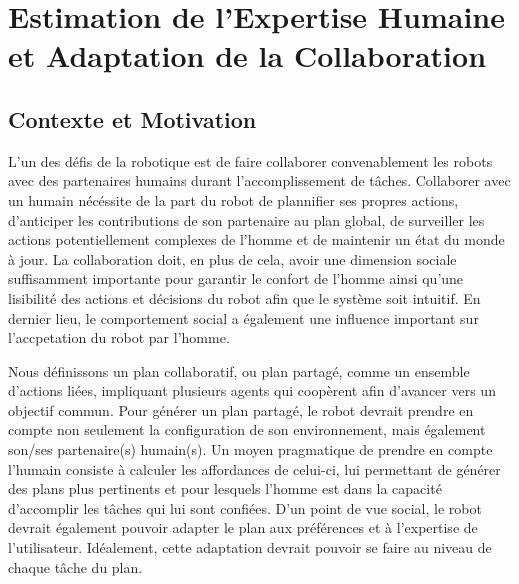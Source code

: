 \documentclass[a4paper,11pt,twoside]{StyleThese}
\begin{document}
\setcounter{chapter}{4} %
\dominitoc
\faketableofcontents
\fi

\chapter{Estimation de l'Expertise Humaine et Adaptation de la Collaboration}
\label{chapter5}
\minitoc

\section{Contexte et Motivation}
L'un des défis de la robotique est de faire collaborer convenablement les robots avec des partenaires humains durant l'accomplissement de tâches. Collaborer avec un humain nécéssite de la part du robot de plannifier ses propres actions, d'anticiper les contributions de son partenaire au plan global, de surveiller les actions potentiellement complexes de l'homme et de maintenir un état du monde à jour. La collaboration doit, en plus de cela, avoir une dimension sociale suffisamment importante pour garantir le confort de l'homme ainsi qu'une lisibilité des actions et décisions du robot afin que le système soit intuitif. En dernier lieu, le comportement social a également une influence important sur l'accpetation du robot par l'homme.

Nous définissons un plan collaboratif, ou plan partagé, comme un ensemble d'actions liées, impliquant plusieurs agents qui coopèrent afin d'avancer vers un objectif commun.
Pour générer un plan partagé, le robot devrait prendre en compte non seulement la configuration de son environnement, mais également son/ses partenaire(s) humain(s). Un moyen pragmatique de prendre en compte l'humain consiste à calculer les affordances de celui-ci, lui permettant de générer des plans plus pertinents et pour lesquels l'homme est dans la capacité d'accomplir les tâches qui lui sont confiées. D'un point de vue social, le robot devrait également pouvoir adapter le plan aux préférences et à l'expertise de l'utilisateur. Idéalement, cette adaptation devrait pouvoir se faire au niveau de chaque tâche du plan.
\end{document}
